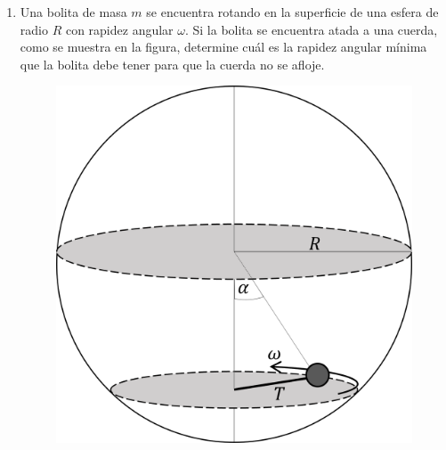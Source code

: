 \documentclass[letterpaper,11pt]{article}
\begin{document}
\begin{enumerate}
\item Una bolita de masa $m$ se encuentra rotando en la superficie de una esfera de radio $R$ con rapidez angular $\omega$. Si la bolita se encuentra atada a una cuerda, como se muestra en la figura, determine cuál es la rapidez angular mínima que la bolita debe tener para que la cuerda no se afloje.

\begin{figure}[H]
    \centering
    \includegraphics[width=0.3\linewidth]{2023-1/img/aux_5/esfera.png}
\end{figure}



%   

\end{enumerate}
\end{document}
